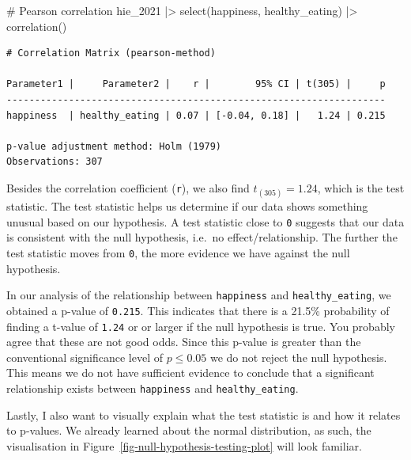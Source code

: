 \documentclass[
  letterpaper,
]{krantz}
\makeatletter
\newenvironment{Shaded}{\begin{snugshade}}{\end{snugshade}}
\newcommand{\CommentTok}[1]{\textcolor[rgb]{0.37,0.37,0.37}{#1}}
\newcommand{\FunctionTok}[1]{\textcolor[rgb]{0.28,0.35,0.67}{#1}}
\newcommand{\NormalTok}[1]{\textcolor[rgb]{0.00,0.23,0.31}{#1}}
\newcommand{\SpecialCharTok}[1]{\textcolor[rgb]{0.37,0.37,0.37}{#1}}
\newenvironment{kframe}{%
\medskip{}
\setlength{\fboxsep}{.8em}
 \def\at@end@of@kframe{}%
 \ifinner\ifhmode%
  \def\at@end@of@kframe{\end{minipage}}%
  \begin{minipage}{\columnwidth}%
 \fi\fi%
 \def\FrameCommand##1{\hskip\@totalleftmargin \hskip-\fboxsep
 \colorbox{shadecolor}{##1}\hskip-\fboxsep
     \hskip-\linewidth \hskip-\@totalleftmargin \hskip\columnwidth}%
 \MakeFramed {\advance\hsize-\width
   \@totalleftmargin\z@ \linewidth\hsize
   \@setminipage}}%
 {\par\unskip\endMakeFramed%
 \at@end@of@kframe}
\renewenvironment{Shaded}{\begin{kframe}}{\end{kframe}}
\makeatother
\begin{document}
\begin{Shaded}
\begin{Highlighting}[]
\CommentTok{\# Pearson correlation}
\NormalTok{hie\_2021 }\SpecialCharTok{|\textgreater{}}
  \FunctionTok{select}\NormalTok{(happiness, healthy\_eating) }\SpecialCharTok{|\textgreater{}}
  \FunctionTok{correlation}\NormalTok{()}
\end{Highlighting}
\end{Shaded}

\begin{verbatim}
# Correlation Matrix (pearson-method)

Parameter1 |     Parameter2 |    r |        95% CI | t(305) |     p
-------------------------------------------------------------------
happiness  | healthy_eating | 0.07 | [-0.04, 0.18] |   1.24 | 0.215

p-value adjustment method: Holm (1979)
Observations: 307
\end{verbatim}

Besides the correlation coefficient (\texttt{r}), we also find
\(t_{(305)} = 1.24\), which is the test statistic. The test statistic
helps us determine if our data shows something unusual based on our
hypothesis. A test statistic close to \texttt{0} suggests that our data
is consistent with the null hypothesis, i.e.~no effect/relationship. The
further the test statistic moves from \texttt{0}, the more evidence we
have against the null hypothesis.

In our analysis of the relationship between \texttt{happiness} and
\texttt{healthy\_eating}, we obtained a p-value of \texttt{0.215}. This
indicates that there is a 21.5\% probability of finding a t-value of
\texttt{1.24} or or larger if the null hypothesis is true. You probably
agree that these are not good odds. Since this p-value is greater than
the conventional significance level of \(p \leq 0.05\) we do not reject
the null hypothesis. This means we do not have sufficient evidence to
conclude that a significant relationship exists between
\texttt{happiness} and \texttt{healthy\_eating}.

Lastly, I also want to visually explain what the test statistic is and
how it relates to p-values. We already learned about the normal
distribution, as such, the visualisation in
Figure~\ref{fig-null-hypothesis-testing-plot} will look familiar.
\end{document}
